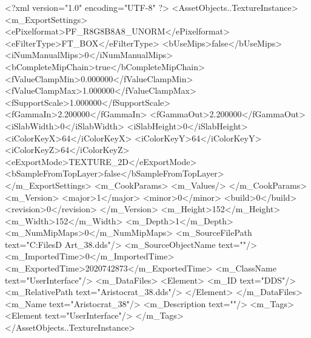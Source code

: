 <?xml version="1.0" encoding="UTF-8" ?>
<AssetObjects..TextureInstance>
	<m_ExportSettings>
		<ePixelformat>PF_R8G8B8A8_UNORM</ePixelformat>
		<eFilterType>FT_BOX</eFilterType>
		<bUseMips>false</bUseMips>
		<iNumManualMips>0</iNumManualMips>
		<bCompleteMipChain>true</bCompleteMipChain>
		<fValueClampMin>0.000000</fValueClampMin>
		<fValueClampMax>1.000000</fValueClampMax>
		<fSupportScale>1.000000</fSupportScale>
		<fGammaIn>2.200000</fGammaIn>
		<fGammaOut>2.200000</fGammaOut>
		<iSlabWidth>0</iSlabWidth>
		<iSlabHeight>0</iSlabHeight>
		<iColorKeyX>64</iColorKeyX>
		<iColorKeyY>64</iColorKeyY>
		<iColorKeyZ>64</iColorKeyZ>
		<eExportMode>TEXTURE_2D</eExportMode>
		<bSampleFromTopLayer>false</bSampleFromTopLayer>
	</m_ExportSettings>
	<m_CookParams>
		<m_Values/>
	</m_CookParams>
	<m_Version>
		<major>1</major>
		<minor>0</minor>
		<build>0</build>
		<revision>0</revision>
	</m_Version>
	<m_Height>152</m_Height>
	<m_Width>152</m_Width>
	<m_Depth>1</m_Depth>
	<m_NumMipMaps>0</m_NumMipMaps>
	<m_SourceFilePath text="C:\Users\Shadow\Desktop\Working Files\2D Art\Quarters\Aristocrat\Aristocrat_38.dds"/>
	<m_SourceObjectName text=""/>
	<m_ImportedTime>0</m_ImportedTime>
	<m_ExportedTime>2020742873</m_ExportedTime>
	<m_ClassName text="UserInterface"/>
	<m_DataFiles>
		<Element>
			<m_ID text="DDS"/>
			<m_RelativePath text="Aristocrat_38.dds"/>
		</Element>
	</m_DataFiles>
	<m_Name text="Aristocrat_38"/>
	<m_Description text=""/>
	<m_Tags>
		<Element text="UserInterface"/>
	</m_Tags>
</AssetObjects..TextureInstance>


